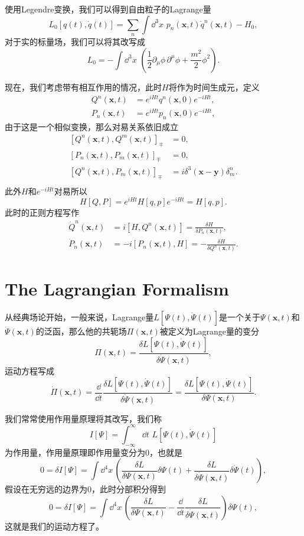 \documentclass[9pt]{extbook}
\theoremstyle{plain}%
\begin{document}
使用Legendre变换，我们可以得到自由粒子的Lagrange量
\[
	L_0[q(t),\dot{q}(t)]=\sum_n \int \dd^3 x\,\,p_n(\mathbf{x},t) \dot{q}^n(\mathbf{x},t)-H_0,
\]
对于实的标量场，我们可以将其改写成
\[
	L_0=-\int \dd^3 x\,\,\left(\frac{1}{2}\partial_\mu\phi\,\partial^\mu\phi+\frac{m^2}{2}\phi^2\right).
\]

现在，我们考虑带有相互作用的情况，此时$H$将作为时间生成元，定义
\[
	\begin{split}
	Q^n(\mathbf{x},t)&=e^{iHt}q^n(\mathbf{x},0)e^{-iHt},\\
	P_n(\mathbf{x},t)&=e^{iHt}p_n(\mathbf{x},0)e^{-iHt},
	\end{split}
\]
由于这是一个相似变换，那么对易关系依旧成立
\[
	\begin{split}
		[Q^n(\mathbf{x},t),Q^m(\mathbf{x},t)]_{\mp}&=0,\\
		[P_n(\mathbf{x},t),P_m(\mathbf{x},t)]_{\mp}&=0,\\
		[Q^n(\mathbf{x},t),P_m(\mathbf{x},t)]_{\mp}&=i\delta^3(\mathbf{x}-\mathbf{y})\delta^n_m.\\
	\end{split}
\]
此外$H$和$e^{-iHt}$对易所以
\[
H[Q,P]=e^{iHt}H[q,p]e^{-iHt}=H[q,p].
\]
此时的正则方程写作
\[
\begin{split}
	\dot{Q}^n(\mathbf{x},t)&=i[H,Q^n(\mathbf{x},t)]=\frac{\delta H}{\delta P_n(\mathbf{x},t)},\\
	\dot{P}_n(\mathbf{x},t)&=-i[P_n(\mathbf{x},t),H]=-\frac{\delta H}{\delta Q^n(\mathbf{x},t)}.
\end{split}
\]
\section{The Lagrangian Formalism}
从经典场论开始，一般来说，Lagrange量$L[\Psi(t),\dot{\Psi}(t)]$是一个关于$\Psi(\mathbf{x},t)$和$\dot{\Psi}(\mathbf{x},t)$的泛函，那么他的共轭场$\Pi(\mathbf{x},t)$被定义为Lagrange量的变分
\[
	\Pi(\mathbf{x},t)=\frac{\delta L[\Psi(t),\dot{\Psi}(t)]}{\delta \dot{\Psi}(\mathbf{x},t)},
\]
运动方程写成
\[
	\dot{\Pi}(\mathbf{x},t)=\frac{\dd}{\dd t}\frac{\delta L[\Psi(t),\dot{\Psi}(t)]}{\delta \dot{\Psi}(\mathbf{x},t)}=\frac{\delta L[\Psi(t),\dot{\Psi}(t)]}{\delta \Psi(\mathbf{x},t)}.
\]

我们常常使用作用量原理将其改写，我们称
\[
	I[\Psi]=\int_{-\infty}^\infty \dd t\,\, L[\Psi(t),\dot{\Psi}(t)]
\]
为作用量，作用量原理即作用量变分为0，也就是
\[
	0=\delta I[\Psi]=\int \dd^4x\,\left(\frac{\delta L}{\delta \Psi(\mathbf{x},t)}\delta \Psi(t)+\frac{\delta L}{\delta \dot{\Psi}(\mathbf{x},t)}\delta\dot{\Psi}(t)\right),
\]
假设在无穷远的边界为0，此时分部积分得到
\[
	0=\delta I[\Psi]=\int \dd^4x\,\left(\frac{\delta L}{\delta \Psi(\mathbf{x},t)}-\frac{\dd}{\dd t}\frac{\delta L}{\delta \dot{\Psi}(\mathbf{x},t)}\right)\delta \Psi(t),
\]
这就是我们的运动方程了。
\end{document}
